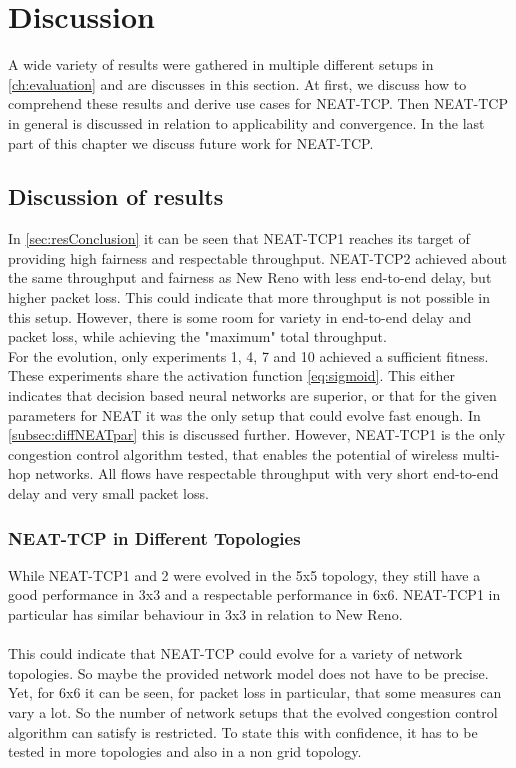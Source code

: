 \chapter{Discussion}\label{ch:discussion} %
\glsresetall %
A wide variety of results were gathered in multiple different setups in \autoref{ch:evaluation} and are discusses in this section. At first, we discuss how to comprehend these results and derive use cases for NEAT-TCP. Then NEAT-TCP in general is discussed in relation to applicability and convergence. In the last part of this chapter we discuss future work for NEAT-TCP.

\section{Discussion of results}\label{sec:resultsDiscussion}
In \autoref{sec:resConclusion} it can be seen that NEAT-TCP1 reaches its target of providing high fairness and respectable throughput. NEAT-TCP2 achieved about the same throughput and fairness as New Reno with less end-to-end delay, but higher packet loss. This could indicate that more throughput is not possible in this setup. However, there is some room for variety in end-to-end delay and packet loss, while achieving the "maximum" total throughput. \\
For the evolution, only experiments 1, 4, 7 and 10 achieved a sufficient fitness. These experiments share the activation function \autoref{eq:sigmoid}. This either indicates that decision based neural networks are superior, or that for the given parameters for NEAT it was the only setup that could evolve fast enough. In \autoref{subsec:diffNEATpar} this is discussed further.
However, NEAT-TCP1 is the only congestion control algorithm tested, that enables the potential of wireless multi-hop networks. All flows have respectable throughput with very short end-to-end delay and very small packet loss. 

\subsection{NEAT-TCP in Different Topologies}\label{subsec:neatDiffTop}
While NEAT-TCP1 and 2 were evolved in the 5x5 topology, they still have a good performance in 3x3 and a respectable performance in 6x6. NEAT-TCP1 in particular has similar behaviour in 3x3 in relation to New Reno. \\\\
This could indicate that NEAT-TCP could evolve for a variety of network topologies. So maybe the provided network model does not have to be precise. Yet, for 6x6 it can be seen, for packet loss in particular, that some measures can vary a lot. So the number of network setups that the evolved congestion control algorithm can satisfy is restricted. To state this with confidence, it has to be tested in more topologies and also in a non grid topology. 

